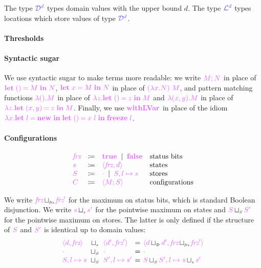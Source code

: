 \documentclass[main.tex]{subfiles}
\begin{document}
The type $\tyD{d}$ types domain values with the upper bound $d$. The type $\tyL{d}$ types locations which store values of type $\tyD{d}$.

\paragraph*{Thresholds}

\paragraph*{Syntactic sugar}
We use syntactic sugar to make terms more readable: we write $\tm{\andthen{M}{N}}$ in place of $\tm{\letunit{M}{N}}$, $\tm{\letbind{x}{M}{N}}$ in place of $\tm{(\lambda x.N)\;M}$, and pattern matching functions $\tm{\lambda\unit.M}$ in place of $\tm{\lambda z.\letunit{z}{M}}$ and $\tm{\lambda\pair{x}{y}.M}$ in place of $\tm{\lambda z.\letpair{x}{y}{z}{M}}$. Finally, we use $\tm{\lvarrun}$ in place of the idiom $\tm{\lambda x.\letbind{l}{\lvarnew}{\letunit{x\;l}{\lvarfreeze\;l}}}$.

\paragraph*{Configurations}
\[
\begin{array}{lrll}
  \tm{\frz}
  & \coloneqq & \tm{\true}
    \sep        \tm{\false}
                                    & \text{status bits}
  \\
  \tm{s}
  & \coloneqq & \tm{\langle \frz, d \rangle} & \text{states}
  \\
  \tm{S}
  & \coloneqq & \tm{\emptyenv}
    \sep        \tm{S, l \mapsto s} & \text{stores}
  \\
  \tm{C}
  & \coloneqq & \tm{\config{M}{S}} & \text{configurations}
\end{array}
\]

We write $\tm{\frz}\sqcupB\tm{\frz'}$ for the maximum on status bits, which is standard Boolean disjunction.
We write $\tm{s}\sqcups\tm{s'}$ for the pointwise maximum on states and $\tm{S}\sqcupS\tm{S'}$ for the pointwise maximum on stores. The latter is only defined if the structure of $\tm{S}$ and $\tm{S'}$ is identical up to domain values:
\[
\setlength{\arraycolsep}{2pt}
\begin{array}{lclcl}
  \tm{\st{d}{\frz}} & \sqcups & \tm{\st{d'}{\frz'}}
  & = & \tm{\st{d \sqcupD d'}{\frz \sqcupB \frz'}} \\
  \tm{\emptyenv}      & \sqcupS & \tm{\emptyenv}        & = & \tm{\emptyenv} \\
  \tm{S, l \mapsto s} & \sqcupS & \tm{S', l \mapsto s'} & = & \tm{S \sqcupS S', l \mapsto s \sqcups s'}
\end{array}
\]
\end{document}
